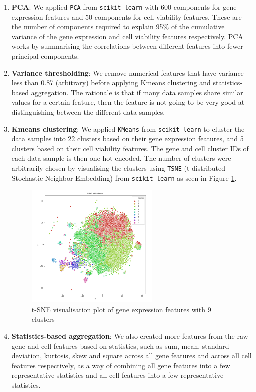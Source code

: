 \documentclass{article}
\begin{document}
\begin{enumerate}
    \item \textbf{PCA}: We applied \texttt{PCA} from \texttt{scikit-learn} with 600 components for gene expression features and 50 components for cell viability features. These are the number of components required to explain 95\% of the cumulative variance of the gene expression and cell viability features respectively. PCA works by summarising the correlations between different features into fewer principal components.
    
    \item \textbf{Variance thresholding}: We remove numerical features that have variance less than 0.87 (arbitrary) before applying Kmeans clustering and statistics-based aggregation. The rationale is that if many data samples share similar values for a certain feature, then the feature is not going to be very good at distinguishing between the different data samples.
    
    \item \textbf{Kmeans clustering}: We applied \texttt{KMeans} from \texttt{scikit-learn} to cluster the data samples into 22 clusters based on their gene expression features, and 5 clusters based on their cell viability features. The gene and cell cluster IDs of each data sample is then one-hot encoded. The number of clusters were arbitrarily chosen by visualising the clusters using \texttt{TSNE} (t-distributed Stochastic Neighbor Embedding) from \texttt{scikit-learn} as seen in Figure \ref{fig:tsne9}.

\begin{figure}[H]
\begin{center}
	\includegraphics[width=0.6\textwidth]{pics/tsne9.png}
    \caption{t-SNE visualisation plot of gene expression features with 9 clusters}
\label{fig:tsne9}
\end{center}
\end{figure}

    \item \textbf{Statistics-based aggregation}: We also created more features from the raw gene and cell features based on statistics, such as sum, mean, standard deviation, kurtosis, skew and square across all gene features and across all cell features respectively, as a way of combining all gene features into a few representative statistics and all cell features into a few representative statistics.
\end{enumerate}
\end{document}
